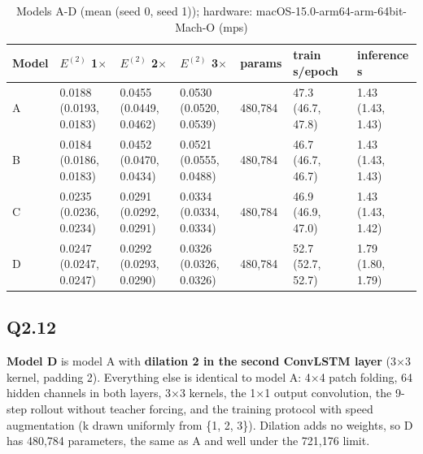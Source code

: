 \documentclass[11pt]{article}
\begin{document}
\begin{table}[!htbp]
\medskip
\begin{tabular}{lllllll}
\toprule
Model & $E^{(2)}$ 1$\times$ & $E^{(2)}$ 2$\times$ & $E^{(2)}$ 3$\times$ & params & train s/epoch & inference s\\
\midrule
A & \makecell[l]{0.0188\\{\scriptsize(0.0193, 0.0183)}} & \makecell[l]{0.0455\\{\scriptsize(0.0449, 0.0462)}} & \makecell[l]{0.0530\\{\scriptsize(0.0520, 0.0539)}} & 480{,}784 & \makecell[l]{47.3\\{\scriptsize(46.7, 47.8)}} & \makecell[l]{1.43\\{\scriptsize(1.43, 1.43)}}\\
B & \makecell[l]{0.0184\\{\scriptsize(0.0186, 0.0183)}} & \makecell[l]{0.0452\\{\scriptsize(0.0470, 0.0434)}} & \makecell[l]{0.0521\\{\scriptsize(0.0555, 0.0488)}} & 480{,}784 & \makecell[l]{46.7\\{\scriptsize(46.7, 46.7)}} & \makecell[l]{1.43\\{\scriptsize(1.43, 1.43)}}\\
C & \makecell[l]{0.0235\\{\scriptsize(0.0236, 0.0234)}} & \makecell[l]{0.0291\\{\scriptsize(0.0292, 0.0291)}} & \makecell[l]{0.0334\\{\scriptsize(0.0334, 0.0334)}} & 480{,}784 & \makecell[l]{46.9\\{\scriptsize(46.9, 47.0)}} & \makecell[l]{1.43\\{\scriptsize(1.43, 1.42)}}\\
D & \makecell[l]{0.0247\\{\scriptsize(0.0247, 0.0247)}} & \makecell[l]{0.0292\\{\scriptsize(0.0293, 0.0290)}} & \makecell[l]{0.0326\\{\scriptsize(0.0326, 0.0326)}} & 480{,}784 & \makecell[l]{52.7\\{\scriptsize(52.7, 52.7)}} & \makecell[l]{1.79\\{\scriptsize(1.80, 1.79)}}\\
\bottomrule
\end{tabular}
\caption{Models A-D (mean (seed 0, seed 1)); hardware: macOS-15.0-arm64-arm-64bit-Mach-O (mps)}
\end{table}

\subsection*{Q2.12}
\textbf{Model D} is model A with \textbf{dilation 2 in the second ConvLSTM layer} (3×3 kernel, padding 2). Everything else is identical to model A: 4×4 patch folding, 64 hidden channels in both layers, 3×3 kernels, the 1×1 output convolution, the 9-step rollout without teacher forcing, and the training protocol with speed augmentation (k drawn uniformly from \{1, 2, 3\}). Dilation adds no weights, so D has 480,784 parameters, the same as A and well under the 721,176 limit.
\end{document}
